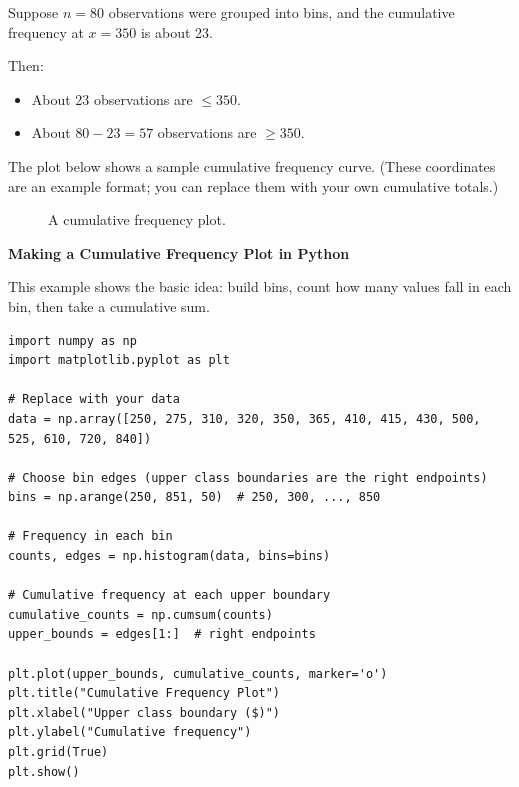 \begin{Worked}
\begin{Problem}
Suppose $n=80$ observations were grouped into bins, and the cumulative frequency at $x = 350$ is about 23.
\end{Problem}
\begin{Solution}
Then:
\begin{itemize}
    \item About 23 observations are $\le 350$.
    \item About $80 - 23 = 57$ observations are $\ge 350$.
\end{itemize}
\end{Solution}
\end{Worked}


The plot below shows a sample cumulative frequency curve.
(These coordinates are an example format; you can replace them with your own cumulative totals.)

\begin{figure}[H]
\centering
{}
\caption{A cumulative frequency plot.}
\label{fig:cumulativeFrequencyExample}
\end{figure}

\textbf{Making a Cumulative Frequency Plot in Python}

This example shows the basic idea: build bins, count how many values fall in each bin, then take a cumulative sum.

\begin{verbatim}
import numpy as np
import matplotlib.pyplot as plt

# Replace with your data
data = np.array([250, 275, 310, 320, 350, 365, 410, 415, 430, 500, 525, 610, 720, 840])

# Choose bin edges (upper class boundaries are the right endpoints)
bins = np.arange(250, 851, 50)  # 250, 300, ..., 850

# Frequency in each bin
counts, edges = np.histogram(data, bins=bins)

# Cumulative frequency at each upper boundary
cumulative_counts = np.cumsum(counts)
upper_bounds = edges[1:]  # right endpoints

plt.plot(upper_bounds, cumulative_counts, marker='o')
plt.title("Cumulative Frequency Plot")
plt.xlabel("Upper class boundary ($)")
plt.ylabel("Cumulative frequency")
plt.grid(True)
plt.show()
\end{verbatim}

